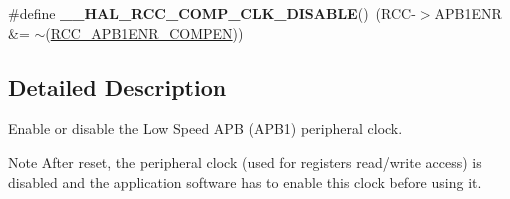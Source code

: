 \begin{DoxyCompactItemize}
\item 
\hypertarget{group___r_c_c___a_p_b1___clock___enable___disable_gab4c437e55b3328cc80e4807ec3484a71}{\#define {\bfseries \-\_\-\-\_\-\-H\-A\-L\-\_\-\-R\-C\-C\-\_\-\-C\-O\-M\-P\-\_\-\-C\-L\-K\-\_\-\-D\-I\-S\-A\-B\-L\-E}()~(R\-C\-C-\/$>$A\-P\-B1\-E\-N\-R \&= $\sim$(\hyperlink{group___peripheral___registers___bits___definition_ga25307398c31b0f372cad700d4c0d26ed}{R\-C\-C\-\_\-\-A\-P\-B1\-E\-N\-R\-\_\-\-C\-O\-M\-P\-E\-N}))}\label{group___r_c_c___a_p_b1___clock___enable___disable_gab4c437e55b3328cc80e4807ec3484a71}

\end{DoxyCompactItemize}


\subsection{Detailed Description}
Enable or disable the Low Speed A\-P\-B (A\-P\-B1) peripheral clock. \begin{DoxyNote}{Note}
After reset, the peripheral clock (used for registers read/write access) is disabled and the application software has to enable this clock before using it. 
\end{DoxyNote}


